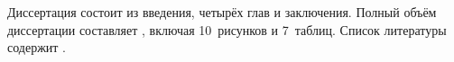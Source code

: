 

\structure
%
%
Диссертация состоит из введения, четырёх глав и заключения.
Полный объём диссертации составляет , включая 10~рисунков и 7~таблиц.
Список литературы содержит .
